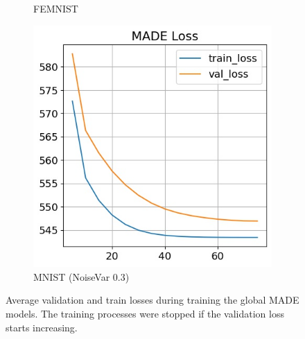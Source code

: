 \documentclass[journal]{IEEEtai}
\begin{document}
\begin{figure}[ht!]
\begin{subfigure}[t]{0.3\linewidth}
		\caption{FEMNIST}
		\label{fig:made_loss_femnist}
	\end{subfigure}
	\hspace{0.01em}%
	\begin{subfigure}[t]{0.3\linewidth}	
		\includegraphics[width=\linewidth]{Figures/mnist/MADE_loss}
		\caption{MNIST (NoiseVar 0.3)  }
		\label{fig:made_loss_mnist}
	\end{subfigure}
	\caption{Average validation and train losses during training the global MADE models. The training processes were stopped if the validation loss starts increasing. }
	\label{fig:made_loss}
\end{figure}
\end{document}
